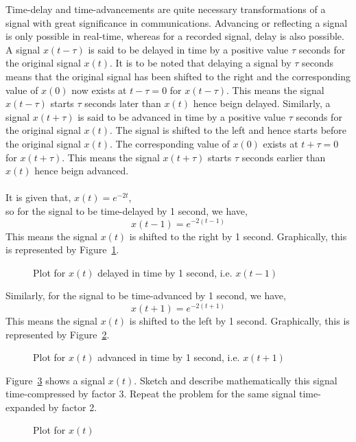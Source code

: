 \documentclass{article}[12 pt]
\begin{document}
\begin{solution}
{
Time-delay and time-advancements are quite necessary transformations of a signal with great significance in communications. Advancing or reflecting a signal is only possible in real-time, whereas for a recorded signal, delay is also possible.\\
A signal $x(t-\tau)$ is said to be delayed in time by a positive value $\tau$ seconds for the original signal $x(t)$. It is to be noted that delaying a signal by $\tau$ seconds means that the original signal has been shifted to the right and the corresponding value of $x(0)$ now exists at $t-\tau=0$ for $x(t-\tau)$. This means the signal $x(t-\tau)$ starts $\tau$ seconds later than $x(t)$ hence beign delayed. Similarly, a signal $x(t+\tau)$ is said to be advanced in time by a positive value $\tau$ seconds for the original signal $x(t)$. The signal is shifted to the left and hence starts before the original signal $x(t)$. The corresponding value of $x(0)$ exists at $t+\tau=0$ for $x(t+\tau)$. This means the signal $x(t+\tau)$ starts $\tau$ seconds earlier than $x(t)$ hence beign advanced.\\\\
It is given that, $x(t)=e^{-2t}$,\\
so for the signal to be time-delayed by 1 second, we have,
\begin{equation*}
x(t-1)=e^{-2(t-1)}
\end{equation*}
This means the signal $x(t)$ is shifted to the right by 1 second. Graphically, this is represented by Figure~\ref{fig:td}.
\begin{figure}[H]
\centering
{}
\caption{Plot for $x(t)$ delayed in time by 1 second, i.e. $x(t-1)$ }
\label{fig:td}
\end{figure}
Similarly, for the signal to be time-advanced by 1 second, we have,\begin{equation*}
x(t+1)=e^{-2(t+1)}
\end{equation*}
This means the signal $x(t)$ is shifted to the left by 1 second. Graphically, this is represented by Figure~\ref{fig:ta}.
\begin{figure}[H]
\centering
{}
\caption{Plot for $x(t)$ advanced in time by 1 second, i.e. $x(t+1)$}
\label{fig:ta}
\end{figure}
}
\end{solution}
\begin{problem}
{Figure~\ref{fig:qb} shows a signal $x(t)$. Sketch and describe mathematically this signal time-compressed by factor 3. Repeat the problem for the same signal time-expanded by factor 2.
\begin{figure}[H]
\centering
{}
\caption{Plot for $x(t)$}
\label{fig:qb}
\end{figure}
}
\end{problem}
\end{document}
